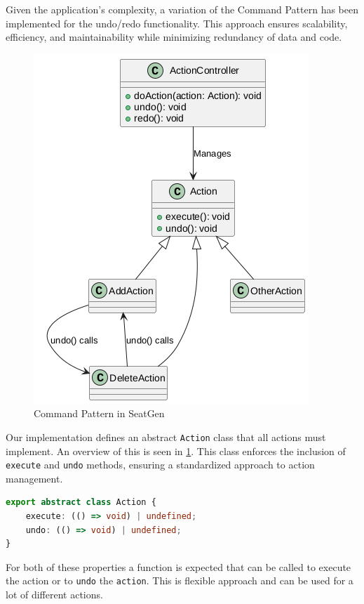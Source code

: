 Given the application's complexity, a variation of the Command Pattern has been implemented for the undo/redo functionality. This approach ensures scalability, efficiency, and maintainability while minimizing redundancy of data and code.


\begin{figure}
    \centering
    \includegraphics[scale=0.5]{pics/command-pattern.png}
    \caption{Command Pattern in SeatGen}
    \label{fig:command-pattern}
\end{figure}

Our implementation defines an abstract \texttt{Action} class that all actions must implement. An overview of this is seen in \ref{fig:command-pattern}. This class enforces the inclusion of \texttt{execute} and \texttt{undo} methods, ensuring a standardized approach to action management.

\begin{lstlisting}[language=TypeScript,caption={Action class},label={lst:action-class}]
export abstract class Action {
    execute: (() => void) | undefined;
    undo: (() => void) | undefined;
}
\end{lstlisting}

For both of these properties a function is expected that can be called to execute the action or to \texttt{undo} the \texttt{action}. This is flexible approach and can be used for a lot of different actions. 

